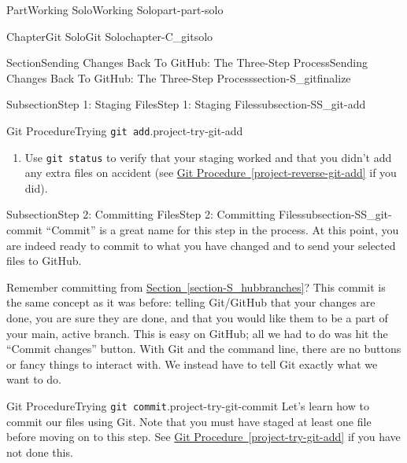 \documentclass[oneside,10pt,]{book}
\newcommand{\blocktitlefont}{\relax}
\newcommand{\xreffont}{\relax}
\newcommand{\mono}[1]{\texttt{#1}}
\begin{document}
\begin{partptx}{Part}{Working Solo}{}{Working Solo}{}{}{part-part-solo}
\begin{chapterptx}{Chapter}{Git Solo}{}{Git Solo}{}{}{chapter-C_gitsolo}
\begin{sectionptx}{Section}{Sending Changes Back To GitHub: The Three-Step Process}{}{Sending Changes Back To GitHub: The Three-Step Process}{}{}{section-S_gitfinalize}
\begin{subsectionptx}{Subsection}{Step 1: Staging Files}{}{Step 1: Staging Files}{}{}{subsection-SS_git-add}
\begin{project}{Git Procedure}{Trying \mono{git add}.}{project-try-git-add}
\begin{enumerate}[font=\bfseries,label=(\alph*),ref=\alph*]
You can run as many or as little \mono{git add} commands as you wish. For instance, you could do \mono{git add images/ my\_file.txt} or you could do \mono{git add images/} and then do \mono{git add my\_file.txt} separately. It's up to you and how comfortable you feel with Git.%
\par
Try now to stage your README file using one of the three cases above.%
\par\smallskip%
\noindent\textbf{\blocktitlefont Hint}.\hypertarget{hint-try-git-add-d-b}{}\quad{}Case 1 or Case 3 will work in this instance.%
\item{}Use \mono{git status} to verify that your staging worked and that you didn't add any extra files on accident (see \hyperref[project-reverse-git-add]{Git Procedure~{\xreffont\ref{project-reverse-git-add}}} if you did).%
\end{enumerate}%
\end{project}%
\end{subsectionptx}
%
%
\typeout{************************************************}
\typeout{************************************************}
%
\begin{subsectionptx}{Subsection}{Step 2: Committing Files}{}{Step 2: Committing Files}{}{}{subsection-SS_git-commit}
%
%
%
%
``Commit'' is a great name for this step in the process. At this point, you are indeed ready to commit to what you have changed and to send your selected files to GitHub.%
\par
Remember committing from \hyperref[section-S_hubbranches]{Section~{\xreffont\ref{section-S_hubbranches}}}? This commit is the same concept as it was before: telling Git\slash{}GitHub that your changes are done, you are sure they are done, and that you would like them to be a part of your main, active branch. This is easy on GitHub; all we had to do was hit the ``Commit changes'' button. With Git and the command line, there are no buttons or fancy things to interact with. We instead have to tell Git exactly what we want to do.%
\begin{project}{Git Procedure}{Trying \mono{git commit}.}{project-try-git-commit}%
Let's learn how to commit our files using Git. Note that you must have staged at least one file before moving on to this step. See \hyperref[project-try-git-add]{Git Procedure~{\xreffont\ref{project-try-git-add}}} if you have not done this.%
\par

\end{project}
\end{subsectionptx}
\end{sectionptx}
\end{chapterptx}
\end{partptx}
\end{document}
